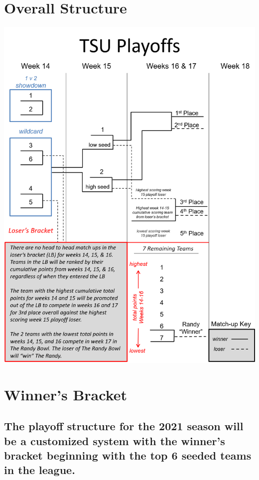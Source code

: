 \documentclass[
]{book}
\begin{document}
\hypertarget{overall-structure}{%
\section{Overall Structure}\label{overall-structure}}

\includegraphics[width=0.9\linewidth]{images/tsu-playoffs}

\hypertarget{winners-bracket}{%
\section{Winner's Bracket}\label{winners-bracket}}

\hypertarget{the-playoff-structure-for-the-2021-season-will-be-a-customized-system-with-the-winners-bracket-beginning-with-the-top-6-seeded-teams-in-the-league.}{%
\subsection{The playoff structure for the 2021 season will be a customized system with the winner's bracket beginning with the top 6 seeded teams in the league.}\label{the-playoff-structure-for-the-2021-season-will-be-a-customized-system-with-the-winners-bracket-beginning-with-the-top-6-seeded-teams-in-the-league.}}
\end{document}
